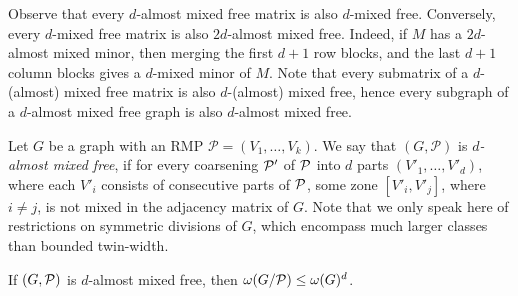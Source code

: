 Observe that every $d$-almost mixed free matrix is also $d$-mixed free. Conversely, every $d$-mixed free matrix is also $2d$-almost mixed free. Indeed, if $M$ has a $2d$-almost mixed minor, then merging the first $d+1$ row blocks, and the last $d+1$ column blocks gives a $d$-mixed minor of $M$. Note that every submatrix of a $d$-(almost) mixed free matrix is also $d$-(almost) mixed free, hence every subgraph of a $d$-almost mixed free graph is also $d$-almost mixed free. 

Let $G$ be a graph with an RMP $\mathcal{P} = (V_1, \ldots, V_k)$. We say that $(G,\mathcal{P})$ is \emph{$d$-almost mixed free}, if for every coarsening $\cal P'$ of $\cal P$ into $d$ parts $(V'_1, \ldots, V'_d)$, where each $V'_i$ consists of consecutive parts of $\cal P$, some zone $[V'_i,V'_j]$, where $i\neq j$, is not mixed in the adjacency matrix of $G$. Note that we only speak here of restrictions on symmetric divisions of $G$, which encompass much larger classes than bounded twin-width. 

\begin{lemma} \label{lem:clique-quotient}
If $(G,\cal P)$ is $d$-almost mixed free, then  $\omega (G/{\cal P})\leq \omega(G)^d$.
\end{lemma} 

